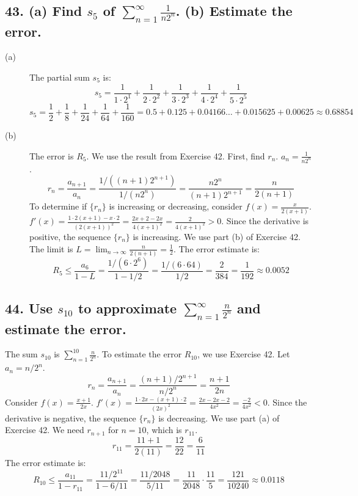 \documentclass{article}
\begin{document}
\subsection*{43. (a) Find $s_5$ of $\sum_{n=1}^\infty \frac{1}{n 2^n}$. (b) Estimate the error.}
\begin{description}
    \item[(a)] The partial sum $s_5$ is:
    \[ s_5 = \frac{1}{1 \cdot 2^1} + \frac{1}{2 \cdot 2^2} + \frac{1}{3 \cdot 2^3} + \frac{1}{4 \cdot 2^4} + \frac{1}{5 \cdot 2^5} \]
    \[ s_5 = \frac{1}{2} + \frac{1}{8} + \frac{1}{24} + \frac{1}{64} + \frac{1}{160} = 0.5 + 0.125 + 0.04166\dots + 0.015625 + 0.00625 \approx 0.68854 \]
    \item[(b)] The error is $R_5$. We use the result from Exercise 42. First, find $r_n$.
    $a_n = \frac{1}{n2^n}$.
    \[ r_n = \frac{a_{n+1}}{a_n} = \frac{1/((n+1)2^{n+1})}{1/(n2^n)} = \frac{n2^n}{(n+1)2^{n+1}} = \frac{n}{2(n+1)} \]
    To determine if $\{r_n\}$ is increasing or decreasing, consider $f(x) = \frac{x}{2(x+1)}$.
    $f'(x) = \frac{1 \cdot 2(x+1) - x \cdot 2}{(2(x+1))^2} = \frac{2x+2-2x}{4(x+1)^2} = \frac{2}{4(x+1)^2} > 0$.
    Since the derivative is positive, the sequence $\{r_n\}$ is increasing.
    We use part (b) of Exercise 42. The limit is $L = \lim_{n \to \infty} \frac{n}{2(n+1)} = \frac{1}{2}$.
    The error estimate is:
    \[ R_5 \le \frac{a_6}{1-L} = \frac{1/(6 \cdot 2^6)}{1-1/2} = \frac{1/(6 \cdot 64)}{1/2} = \frac{2}{384} = \frac{1}{192} \approx 0.0052 \]
\end{description}

\subsection*{44. Use $s_{10}$ to approximate $\sum_{n=1}^\infty \frac{n}{2^n}$ and estimate the error.}
The sum $s_{10}$ is $\sum_{n=1}^{10} \frac{n}{2^n}$.
To estimate the error $R_{10}$, we use Exercise 42. Let $a_n = n/2^n$.
\[ r_n = \frac{a_{n+1}}{a_n} = \frac{(n+1)/2^{n+1}}{n/2^n} = \frac{n+1}{2n} \]
Consider $f(x) = \frac{x+1}{2x}$. $f'(x) = \frac{1 \cdot 2x - (x+1) \cdot 2}{(2x)^2} = \frac{2x-2x-2}{4x^2} = \frac{-2}{4x^2} < 0$.
Since the derivative is negative, the sequence $\{r_n\}$ is decreasing.
We use part (a) of Exercise 42. We need $r_{n+1}$ for $n=10$, which is $r_{11}$.
\[ r_{11} = \frac{11+1}{2(11)} = \frac{12}{22} = \frac{6}{11} \]
The error estimate is:
\[ R_{10} \le \frac{a_{11}}{1-r_{11}} = \frac{11/2^{11}}{1-6/11} = \frac{11/2048}{5/11} = \frac{11}{2048} \cdot \frac{11}{5} = \frac{121}{10240} \approx 0.0118 \]
\end{document}
